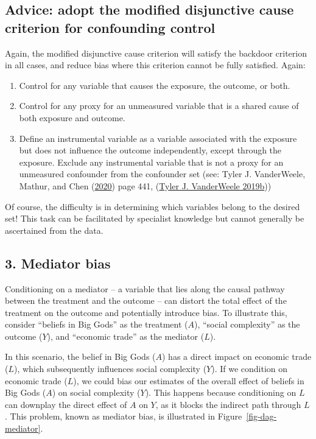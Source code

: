 \documentclass[
  singlecolumn]{report}
\providecommand{\tightlist}{%
  \setlength{\itemsep}{0pt}\setlength{\parskip}{0pt}}\usepackage{longtable,booktabs,array}
\begin{document}
\hypertarget{advice-adopt-the-modified-disjunctive-cause-criterion-for-confounding-control}{%
\subsection{Advice: adopt the modified disjunctive cause criterion for
confounding
control}\label{advice-adopt-the-modified-disjunctive-cause-criterion-for-confounding-control}}

Again, the modified disjunctive cause criterion will satisfy the
backdoor criterion in all cases, and reduce bias where this criterion
cannot be fully satisfied. Again:

\begin{enumerate}
\def\labelenumi{\alph{enumi}.}
\tightlist
\item
  Control for any variable that causes the exposure, the outcome, or
  both.
\item
  Control for any proxy for an unmeasured variable that is a shared
  cause of both exposure and outcome.
\item
  Define an instrumental variable as a variable associated with the
  exposure but does not influence the outcome independently, except
  through the exposure. Exclude any instrumental variable that is not a
  proxy for an unmeasured confounder from the confounder set (see: Tyler
  J. VanderWeele, Mathur, and Chen
  (\protect\hyperlink{ref-vanderweele2020}{2020}) page 441,
  (\protect\hyperlink{ref-vanderweele2019a}{Tyler J. VanderWeele
  2019b}))
\end{enumerate}

Of course, the difficulty is in determining which variables belong to
the desired set! This task can be facilitated by specialist knowledge
but cannot generally be ascertained from the data.

\hypertarget{mediator-bias}{%
\subsection{3. Mediator bias}\label{mediator-bias}}

Conditioning on a mediator -- a variable that lies along the causal
pathway between the treatment and the outcome -- can distort the total
effect of the treatment on the outcome and potentially introduce bias.
To illustrate this, consider ``beliefs in Big Gods'' as the treatment
(\(A\)), ``social complexity'' as the outcome (\(Y\)), and ``economic
trade'' as the mediator (\(L\)).

In this scenario, the belief in Big Gods (\(A\)) has a direct impact on
economic trade (\(L\)), which subsequently influences social complexity
(\(Y\)). If we condition on economic trade (\(L\)), we could bias our
estimates of the overall effect of beliefs in Big Gods (\(A\)) on social
complexity (\(Y\)). This happens because conditioning on \(L\) can
downplay the direct effect of \(A\) on \(Y\), as it blocks the indirect
path through \(L\). This problem, known as mediator bias, is illustrated
in Figure~\ref{fig-dag-mediator}.
\end{document}
